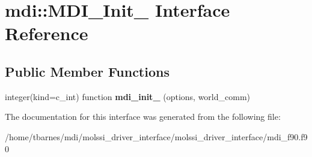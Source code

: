 \hypertarget{interfacemdi_1_1MDI__Init__}{\section{mdi\-:\-:M\-D\-I\-\_\-\-Init\-\_\- Interface Reference}
\label{interfacemdi_1_1MDI__Init__}
}
\subsection*{Public Member Functions}
\begin{DoxyCompactItemize}
\item 
\hypertarget{interfacemdi_1_1MDI__Init___a6d3a67f8175464baa0a4e54caecfa2ae}{integer(kind=c\-\_\-int) function {\bfseries mdi\-\_\-init\-\_\-} (options, world\-\_\-comm)}\label{interfacemdi_1_1MDI__Init___a6d3a67f8175464baa0a4e54caecfa2ae}

\end{DoxyCompactItemize}


The documentation for this interface was generated from the following file\-:\begin{DoxyCompactItemize}
\item 
/home/tbarnes/mdi/molssi\-\_\-driver\-\_\-interface/molssi\-\_\-driver\-\_\-interface/mdi\-\_\-f90.\-f90\end{DoxyCompactItemize}
